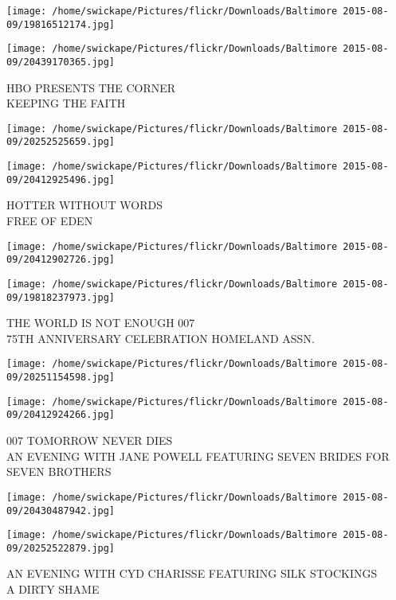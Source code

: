 \documentclass[10pt,letterpaper]{article}
\begin{document}
\texttt{[image: /home/swickape/Pictures/flickr/Downloads/Baltimore 2015-08-09/19816512174.jpg]}

\vspace{0.25in}
\texttt{[image: /home/swickape/Pictures/flickr/Downloads/Baltimore 2015-08-09/20439170365.jpg]}

HBO PRESENTS THE CORNER\\
KEEPING THE FAITH
\pagebreak

\texttt{[image: /home/swickape/Pictures/flickr/Downloads/Baltimore 2015-08-09/20252525659.jpg]}

\vspace{0.25in}
\texttt{[image: /home/swickape/Pictures/flickr/Downloads/Baltimore 2015-08-09/20412925496.jpg]}

HOTTER WITHOUT WORDS\\
FREE OF EDEN
\pagebreak

\texttt{[image: /home/swickape/Pictures/flickr/Downloads/Baltimore 2015-08-09/20412902726.jpg]}

\vspace{0.25in}
\texttt{[image: /home/swickape/Pictures/flickr/Downloads/Baltimore 2015-08-09/19818237973.jpg]}

THE WORLD IS NOT ENOUGH 007\\
75TH ANNIVERSARY CELEBRATION HOMELAND ASSN.
\pagebreak

\texttt{[image: /home/swickape/Pictures/flickr/Downloads/Baltimore 2015-08-09/20251154598.jpg]}

\vspace{0.25in}
\texttt{[image: /home/swickape/Pictures/flickr/Downloads/Baltimore 2015-08-09/20412924266.jpg]}

007 TOMORROW NEVER DIES\\
AN EVENING WITH JANE POWELL FEATURING SEVEN BRIDES FOR SEVEN BROTHERS
\pagebreak

\texttt{[image: /home/swickape/Pictures/flickr/Downloads/Baltimore 2015-08-09/20430487942.jpg]}

\vspace{0.25in}
\texttt{[image: /home/swickape/Pictures/flickr/Downloads/Baltimore 2015-08-09/20252522879.jpg]}

AN EVENING WITH CYD CHARISSE FEATURING SILK STOCKINGS\\
A DIRTY SHAME
\pagebreak
\end{document}
